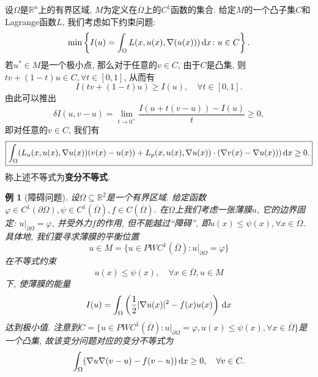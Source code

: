 \documentclass[12pt,a4paper]{article}
\newtheorem{example}[theorem]{例}
\begin{document}
设$\Omega$是$\mathbb{R}^n$上的有界区域, $M$为定义在$\overline{\Omega}$上的$C^1$函数的集合.
给定$M$的一个凸子集$C$和Lagrange函数$L$, 我们考虑如下约束问题:
\begin{equation*}
    \min\left\{I(u) = \int_{\Omega}L(x, u(x), \nabla (u(x))) \,{\rm d}x \colon u \in C\right\}. 
\end{equation*}
若$u^* \in M$是一个极小点, 那么对于任意的$v \in C$, 由于$C$是凸集, 则$tv + (1 - t)u \in C, \forall t \in [0, 1]$, 从而有 
\begin{equation*}
    I(tv + (1 - t)u) \geq I(u), \quad \forall t \in [0, 1]. 
\end{equation*}
由此可以推出 
\begin{equation*}
    \delta I(u, v - u) = \lim_{t \rightarrow 0^+}\frac{I(u + t(v - u)) - I(u)}{t} \geq 0,
\end{equation*}
即对任意的$v \in C$, 我们有 
\begin{equation*}
    \boxed{\int_{\Omega}(L_u(x, u(x), \nabla u(x))(v(x) - u(x)) + L_p(x, u(x), \nabla u(x)) \cdot (\nabla v(x) - \nabla u(x))) \,{\rm d}x \geq 0.}
\end{equation*}
称上述不等式为\textbf{变分不等式}.

\begin{example}[障碍问题]
    设$\Omega \subseteq \mathbb{R}^2$是一个有界区域. 给定函数$\varphi \in C^1(\partial\Omega), \psi \in C^1(\overline{\Omega}), f \in C(\overline{\Omega})$.
    在$\Omega$上我们考虑一张薄膜$u$, 它的边界固定: $u|_{\partial\Omega} = \varphi$, 并受外力$f$的作用, 但不能越过``障碍'', 即$u(x) \leq \psi(x), \forall x \in \overline{\Omega}$.
    具体地, 我们要寻求薄膜的平衡位置 
    \begin{equation*}
        u \in M = \{u \in PWC^1(\overline{\Omega})\colon u|_{\partial\Omega} = \varphi\}
    \end{equation*}
    在不等式约束 
    \begin{equation*}
        u(x) \leq \psi(x), \quad \forall x \in \overline{\Omega}, u \in M
    \end{equation*}
    下, 使薄膜的能量 
    \begin{equation*}
        I(u) = \int_{\Omega}\left(\frac{1}{2}|\nabla u(x)|^2 - f(x)u(x)\right) \,{\rm d}x
    \end{equation*}
    达到极小值. 注意到$C = \{u \in PWC^1(\overline{\Omega})\colon u|_{\partial\Omega} = \varphi, u(x) \leq \psi(x), \forall x \in \overline{\Omega}\}$是一个凸集, 故该变分问题对应的变分不等式为
    \begin{equation*}
        \int_{\Omega}(\nabla u\nabla(v - u) - f(v - u)) \,{\rm d}x \geq 0, \quad \forall v \in C.
    \end{equation*} 
\end{example}
\end{document}
